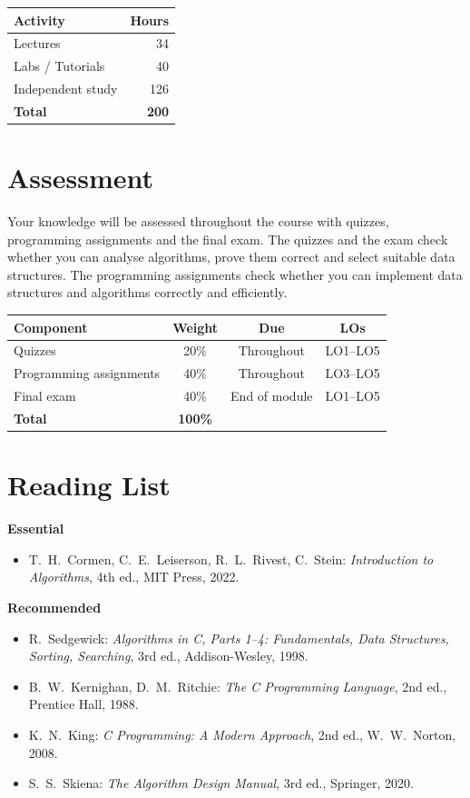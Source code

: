 \documentclass[11pt,a4paper]{article}
\begin{document}
\begin{tabularx}{0.6\textwidth}{X r}
\toprule
\textbf{Activity} & \textbf{Hours} \\
\midrule
Lectures            & 34 \\
Labs / Tutorials    & 40 \\
Independent study   & 126 \\
\midrule
\textbf{Total}      & \textbf{200} \\
\bottomrule
\end{tabularx}

\section{Assessment}
Your knowledge will be assessed throughout the course with quizzes, programming
assignments and the final exam. The quizzes and the exam check whether you can
analyse algorithms, prove them correct and select suitable data structures. The
programming assignments check whether you can implement data structures and
algorithms correctly and efficiently.

\begin{tabularx}{\textwidth}{X c c c}
\toprule
\textbf{Component} & \textbf{Weight} & \textbf{Due} & \textbf{LOs} \\
\midrule
Quizzes & 20\% & Throughout & LO1--LO5 \\
Programming assignments & 40\% & Throughout & LO3--LO5 \\
Final exam & 40\% & End of module & LO1--LO5 \\
\midrule
\textbf{Total} & \textbf{100\%} & & \\
\bottomrule
\end{tabularx}

\section{Reading List}
\textbf{Essential}
\begin{itemize}
  \item T.\ H.\ Cormen, C.\ E.\ Leiserson, R.\ L.\ Rivest, C.\ Stein: \textit{Introduction to Algorithms}, 4th ed., MIT Press, 2022.
\end{itemize}
\textbf{Recommended}
\begin{itemize}
  \item R.\ Sedgewick: \textit{Algorithms in C, Parts 1--4: Fundamentals, Data Structures, Sorting, Searching}, 3rd ed., Addison-Wesley, 1998.
  \item B.\ W.\ Kernighan, D.\ M.\ Ritchie: \textit{The C Programming Language}, 2nd ed., Prentice Hall, 1988.
  \item K.\ N.\ King: \textit{C Programming: A Modern Approach}, 2nd ed., W.\ W.\ Norton, 2008.
  \item S.\ S.\ Skiena: \textit{The Algorithm Design Manual}, 3rd ed., Springer, 2020.
\end{itemize}
\end{document}
